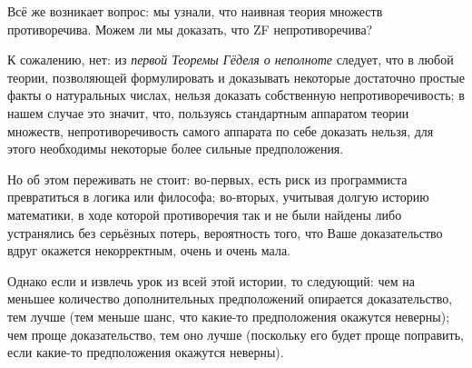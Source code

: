 Всё же возникает вопрос: мы узнали, что наивная теория множеств противоречива.
Можем ли мы доказать, что ZF непротиворечива?

К сожалению, нет: из \textit{первой Теоремы Гёделя о неполноте} следует, что в
любой теории, позволяющей формулировать и доказывать некоторые достаточно
простые факты о натуральных числах, нельзя доказать собственную
непротиворечивость; в нашем случае это значит, что, пользуясь стандартным
аппаратом теории множеств, непротиворечивость самого аппарата по себе доказать
нельзя, для этого необходимы некоторые более сильные предположения.

Но об этом переживать не стоит: во-первых, есть риск из программиста
превратиться в логика или философа; во-вторых, учитывая долгую историю
математики, в ходе которой противоречия так и не были найдены либо устранялись
без серьёзных потерь, вероятность того, что Ваше доказательство вдруг окажется
некорректным, очень и очень мала.

Однако если и извлечь урок из всей этой истории, то следующий: чем на меньшее
количество дополнительных предположений опирается доказательство, тем лучше
(тем меньше шанс, что какие-то предположения окажутся неверны); чем проще
доказательство, тем оно лучше (поскольку его будет проще поправить, если
какие-то предположения окажутся неверны).
